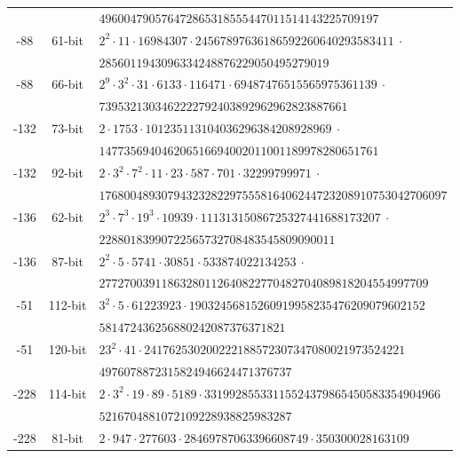 \documentclass{amsart}
\begin{document}
\begin{table*}[ht]
\begin{tabularx}{\textwidth}{ccl}
         			&   & \tt $496004790576472865318555447011514143225709197$ \\   
        -88  &  61-bit & \tt $ 2^2 \cdot 11 \cdot 16984307 \cdot 24567897636186592260640293583411~\cdot$  \\
         			&   & \tt $2856011943096334248876229050495279019$ \\   
        -88  &  66-bit & \tt $ 2^9 \cdot 3^2 \cdot 31 \cdot 6133 \cdot 116471 \cdot 69487476515565975361139~\cdot$  \\
         			&   & \tt $7395321303462222792403892962962823887661$ \\   
        -132 &  73-bit & \tt $  2 \cdot 1753 \cdot 101235113104036296384208928969~\cdot$  \\
         			&   & \tt $ 147735694046206516694002011001189978280651761$\\   			
        -132 &  92-bit & \tt $ 2 \cdot 3^2 \cdot 7^2 \cdot 11 \cdot 23 \cdot 587 \cdot 701 \cdot 32299799971~\cdot$  \\
         			&   & \tt $ 17680048930794323282297555816406244723208910753042706097$\\   	
        -136 &  62-bit & \tt $  2^3 \cdot 7^3 \cdot 19^3 \cdot 10939 \cdot 11131315086725327441688173207 ~\cdot$  \\
         			&   & \tt $ 22880183990722565732708483545809090011$\\  
        -136 &  87-bit & \tt $  2^2 \cdot 5 \cdot 5741 \cdot 30851 \cdot 533874022134253  ~\cdot$  \\
         			&   & \tt  $ 27727003911863280112640822770482704089818204554997709$\\  
       	 -51 &  112-bit & \tt $  3^2 \cdot 5 \cdot 61223923 \cdot 19032456815260919958235476209079602152$  \\
         			&   & \tt  $ 581472436256880242087376371821$\\  
       	 -51 &  120-bit & \tt $  23^2 \cdot 41 \cdot 241762530200222188572307347080021973524221$  \\
         			&   & \tt   $ 4976078872315824946624471376737$\\  
       	 -228 &  114-bit & \tt $  2 \cdot 3^2 \cdot 19 \cdot 89 \cdot 5189 \cdot 33199285533115524379865450583354904966$  \\
         			&   & \tt   $ 5216704881072109228938825983287$\\  
       	 -228 &  81-bit & \tt $  2 \cdot 947 \cdot 277603 \cdot 28469787063396608749 \cdot 350300028163109$  \\

\end{tabularx}
\end{table*}
\end{document}
